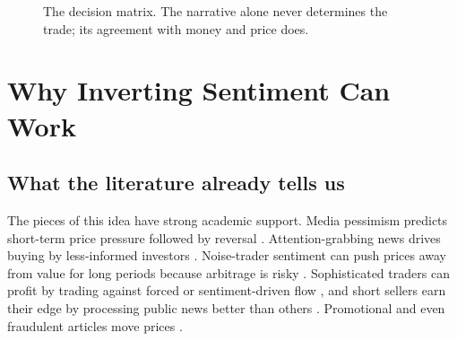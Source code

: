 \documentclass[11pt,a4paper]{article}
\theoremstyle{plain}
\theoremstyle{definition}
\begin{document}
\begin{figure}[ht]
\centering
{}
\caption{The decision matrix. The narrative alone never determines the trade; its agreement with money and price does.}
\label{fig:matrix}
\end{figure}

\section{Why Inverting Sentiment Can Work}\label{sec:why}

\subsection{What the literature already tells us}

The pieces of this idea have strong academic support. Media pessimism predicts short-term price pressure followed by reversal \citep{tetlock2007}. Attention-grabbing news drives buying by less-informed investors \citep{barber2008,da2011}. Noise-trader sentiment can push prices away from value for long periods because arbitrage is risky \citep{delong1990,shleifer1997}. Sophisticated traders can profit by trading against forced or sentiment-driven flow \citep{brunnermeier2005}, and short sellers earn their edge by processing public news better than others \citep{engelberg2012}. Promotional and even fraudulent articles move prices \citep{kogan2023}.
\end{document}
